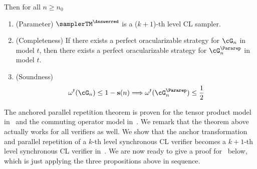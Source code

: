 \begin{proposition}
	Then for all $n \geq n_0$
	\begin{enumerate}
		\item (Parameter) $\samplerTM^{\Answerred}$ is a ($k+1$)-th level CL sampler.
		\item (Completeness) If there exists a perfect oracularizable strategy for $\cG_n$ in model $t$, then there exists a perfect oracularizable strategy for $\cG^{\Pararep}_n$ in model $t$. 
		\item (Soundness) 
		\begin{equation*}
			\omega^t(\cG_n) \leq 1 - \mathbf{s}(n) \Longrightarrow \omega^t(\cG^{\Pararep}_n) \leq \frac{1}{2}
		\end{equation*}
	\end{enumerate}
\end{proposition}

The anchored parallel repetition theorem is proven for the tensor product model in~\cite{bavarianAnchoredParallelRepetition2021} and the commuting operator model in~. We remark that the theorem above actually works for all verifiers as well. We show that the anchor transformation and parallel repetition of a $k$-th level synchronous CL verifier becomes a $k+1$-th level synchronous CL verifier in~. We are now ready to give a proof for~ below, which is just applying the three propositions above in sequence. 

